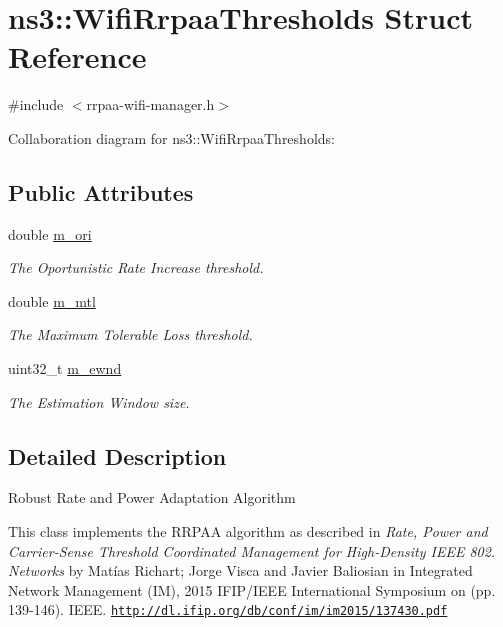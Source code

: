 \hypertarget{structns3_1_1WifiRrpaaThresholds}{}\section{ns3\+:\+:Wifi\+Rrpaa\+Thresholds Struct Reference}
\label{structns3_1_1WifiRrpaaThresholds}


{\ttfamily \#include $<$rrpaa-\/wifi-\/manager.\+h$>$}



Collaboration diagram for ns3\+:\+:Wifi\+Rrpaa\+Thresholds\+:
\subsection*{Public Attributes}
\begin{DoxyCompactItemize}
\item 
double \hyperlink{structns3_1_1WifiRrpaaThresholds_a43ec6ffaf79ea43b54d46009188be3a9}{m\+\_\+ori}
\begin{DoxyCompactList}\small\item\em The Oportunistic Rate Increase threshold. \end{DoxyCompactList}\item 
double \hyperlink{structns3_1_1WifiRrpaaThresholds_ae03ff2317ee562d192df261f1ddc124b}{m\+\_\+mtl}
\begin{DoxyCompactList}\small\item\em The Maximum Tolerable Loss threshold. \end{DoxyCompactList}\item 
uint32\+\_\+t \hyperlink{structns3_1_1WifiRrpaaThresholds_a494e810bf172c14228fa4bda22af23a3}{m\+\_\+ewnd}
\begin{DoxyCompactList}\small\item\em The Estimation Window size. \end{DoxyCompactList}\end{DoxyCompactItemize}


\subsection{Detailed Description}
Robust Rate and Power Adaptation Algorithm

This class implements the R\+R\+P\+AA algorithm as described in {\itshape Rate, Power and Carrier-\/\+Sense Threshold Coordinated Management for High-\/\+Density I\+E\+EE 802. Networks} by Matías Richart; Jorge Visca and Javier Baliosian in Integrated Network Management (IM), 2015 I\+F\+I\+P/\+I\+E\+EE International Symposium on (pp. 139-\/146). I\+E\+EE. \href{http://dl.ifip.org/db/conf/im/im2015/137430.pdf}{\tt http\+://dl.\+ifip.\+org/db/conf/im/im2015/137430.\+pdf}

